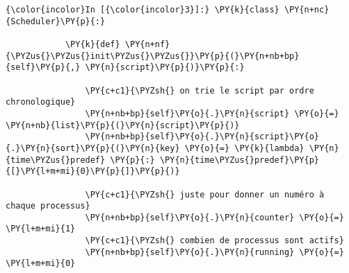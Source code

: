     \begin{Verbatim}[commandchars=\\\{\},frame=single,framerule=0.3mm,rulecolor=\color{cellframecolor}]
{\color{incolor}In [{\color{incolor}3}]:} \PY{k}{class} \PY{n+nc}{Scheduler}\PY{p}{:}
        
            \PY{k}{def} \PY{n+nf}{\PYZus{}\PYZus{}init\PYZus{}\PYZus{}}\PY{p}{(}\PY{n+nb+bp}{self}\PY{p}{,} \PY{n}{script}\PY{p}{)}\PY{p}{:}
        
                \PY{c+c1}{\PYZsh{} on trie le script par ordre chronologique}
                \PY{n+nb+bp}{self}\PY{o}{.}\PY{n}{script} \PY{o}{=} \PY{n+nb}{list}\PY{p}{(}\PY{n}{script}\PY{p}{)}
                \PY{n+nb+bp}{self}\PY{o}{.}\PY{n}{script}\PY{o}{.}\PY{n}{sort}\PY{p}{(}\PY{n}{key} \PY{o}{=} \PY{k}{lambda} \PY{n}{time\PYZus{}predef} \PY{p}{:} \PY{n}{time\PYZus{}predef}\PY{p}{[}\PY{l+m+mi}{0}\PY{p}{]}\PY{p}{)}
        
                \PY{c+c1}{\PYZsh{} juste pour donner un numéro à chaque processus}
                \PY{n+nb+bp}{self}\PY{o}{.}\PY{n}{counter} \PY{o}{=} \PY{l+m+mi}{1}
                \PY{c+c1}{\PYZsh{} combien de processus sont actifs}
                \PY{n+nb+bp}{self}\PY{o}{.}\PY{n}{running} \PY{o}{=} \PY{l+m+mi}{0}
        

\end{Verbatim}
